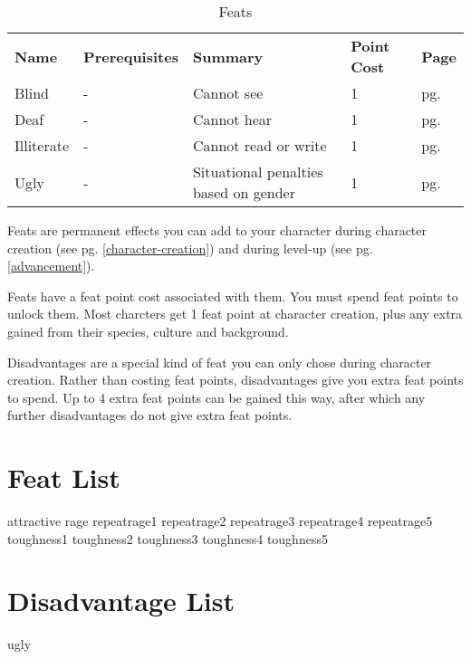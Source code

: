 \begin{multicols*}{2}
\begin{table*}[ht]
\begin{tabularx}{\textwidth}{l X X l l}
            \textbf{Name} & \textbf{Prerequisites} & \textbf{Summary} & \textbf{Point Cost} & \textbf{Page} \\
            Blind & - & Cannot see & 1 & pg. \pageref{flaw:blind} \\
            Deaf & - & Cannot hear & 1 & pg. \pageref{flaw:deaf} \\
            Illiterate & - & Cannot read or write & 1 & pg. \pageref{flaw:illiterate} \\
            Ugly & - & Situational penalties based on gender & 1 & pg. \pageref{flaw:ugly} \\
        \end{tabularx}
        \caption{Feats}
        \label{tab:feats}
    \end{table*}

    Feats are permanent effects you can add to your character during character
    creation (see pg. \ref{character-creation}) and during level-up (see pg.
    \ref{advancement}).

    Feats have a feat point cost associated with them. You must spend feat
    points to unlock them. Most charcters get 1 feat point at character
    creation, plus any extra gained from their species, culture and background.

    Disadvantages are a special kind of feat you can only chose during
    character creation. Rather than costing feat points, disadvantages give you
    extra feat points to spend. Up to 4 extra feat points can be gained this
    way, after which any further disadvantages do not give extra feat points.

    \section{Feat List}
    {attractive}
    {rage}
    {repeatrage1}
    {repeatrage2}
    {repeatrage3}
    {repeatrage4}
    {repeatrage5}
    {toughness1}
    {toughness2}
    {toughness3}
    {toughness4}
    {toughness5}

    \section{Disadvantage List}
    {ugly}

\end{multicols*}
